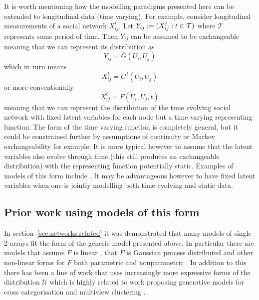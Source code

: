 It is worth mentioning how the modelling paradigms presented here can be extended to longitudinal data (\ie time varying).
For example, consider longitudinal measurements of a social network $X_{ij}^t$.
Let $Y_{ij} := (X_{ij}^t : t \in \mathcal{T})$ where $\mathcal{T}$ represents some period of time.
Then $Y_{ij}$ can be assumed to be exchangeable meaning that we can represent its distribution as
\[
  Y_{ij} = G(U_i, U_j)
\]
which in turn means
\[
  X_{ij}^t = G^t(U_i, U_j)
\]
or more conventionally
\[
  X_{ij}^t = F(U_i, U_j, t)
\]
meaning that we can represent the distribution of the time evolving social network with fixed latent variables for each node but a time varying representing function.
The form of the time varying function is completely general, but it could be constrained further by assumptions of continuity or Markov exchangeability for example.
It is more typical however to assume that the latent variables also evolve through time (this still produces an exchangeable distribution) with the representing function potentially static.
Examples of models of this form include \citep[e.g.][]{Adams2010-ln, durante2014bayesian}.
It may be advantageous however to have fixed latent variables when one is jointly modelling both time evolving and static data.

\subsection{Prior work using models of this form}
\label{sec:arrays:related}

In section~\ref{sec:networks:related} it was demonstrated that many models of single 2-arrays fit the form of the generic model presented above.
In particular there are models that assume $F$ is linear \citep[e.g.][]{Hoff2007-ja, Meeds2007-gd, Salakhutdinov2008-zt, Yu2008-tz, Miller2009-wg}, that $F$ is Gaussian process distributed \citep[e.g.][]{Lawrence2009-za, Yan2011-lc, Lloyd2012-sb} and other non-linear forms for $F$ both parametric \citep[e.g.][]{Hoff2002-vy} and nonparametric \citep[e.g.][]{Roy2009-ge}.
In addition to this there has been a line of work that uses increasingly more expressive forms of the distribution $\mathcal{U}$ \citep[e.g.][]{Wang1987-jd, Hoffman_undated-ri, Nowicki2001-xm, Kemp2006-jt, Xu2006-uy, Meeds2007-gd, Miller2009-wg, Palla2012-ch} which is highly related to work proposing generative models for cross categorisation and multiview clustering \citep[e.g.][]{Niu2012-kl, Li2011-bk, Shafto2011-pu, Mansinghka2009-lx}.

